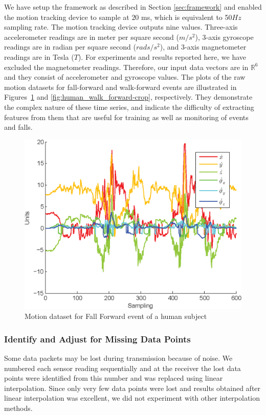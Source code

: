 \documentclass[]{IEEEtran}
\begin{document}
We have setup the framework as described in Section \ref{sec:framework} and enabled the 
motion tracking device to sample at $20$ ms, which is equivalent to 50$Hz$ 
sampling rate. The motion tracking device outputs nine values. Three-axis  
accelerometer readings are in  meter per square second ($m/s^2$), 3-axis gyroscope readings are 
in radian per square second ($rads/s^2$), and  3-axis magnetometer readings are  in 
Tesla ($T$). For experiments  and results reported here, we have excluded the magnetometer readings. Therefore, 
our input data vectors  are in $\mathbb{R}^6$ and they consist of accelerometer and gyroscope 
values. The plots of the raw motion datasets for fall-forward and  walk-forward events are illustrated in Figures~\ref{fig:human_fall_forward_crop} and \ref{fig:human_walk_forward-crop}, respectively. They demonstrate the complex nature of these time series, and indicate the difficulty of extracting features from them that are useful for training as well as monitoring of events and falls.
\begin{figure}[htb]
	\centering
		\includegraphics[width=0.95\columnwidth]{plots/human_falling-crop.eps}
	\caption{Motion dataset for  Fall Forward event of a human subject}
	\label{fig:human_fall_forward_crop}
\end{figure}


\subsubsection{Identify and Adjust for Missing Data Points}
\label{sec:IdentifyAndAdjustForMissingDataPoints}
Some data packets may be lost during transmission because of noise. We numbered each 
sensor reading sequentially and at the receiver the lost data points were identified from this number and was 
replaced using linear interpolation. Since only very few data points were lost and 
results obtained after linear interpolation was excellent, we did not experiment with other 
interpolation methods.
\end{document}
